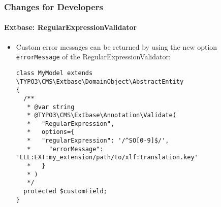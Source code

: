 %

\begin{frame}[fragile]
	\frametitle{Changes for Developers}
	\framesubtitle{Extbase: RegularExpressionValidator}


	\begin{itemize}
		\item Custom error messages can be returned by using the new option
			\texttt{errorMessage} of the RegularExpressionValidator:
\begin{lstlisting}
class MyModel extends \TYPO3\CMS\Extbase\DomainObject\AbstractEntity
{
  /**
   * @var string
   * @TYPO3\CMS\Extbase\Annotation\Validate(
   *   "RegularExpression",
   *   options={
   *   "regularExpression": '/^SO[0-9]$/',
   *     "errorMessage": 'LLL:EXT:my_extension/path/to/xlf:translation.key'
   *   }
   * )
   */
  protected $customField;
}
\end{lstlisting}

	\end{itemize}

\end{frame}

